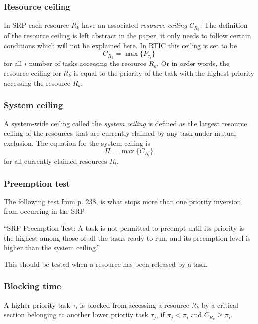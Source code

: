 \subsubsection{Resource ceiling}
\label{theory:srp:definitions:resource}
In SRP each resource $R_k$ have an associated \emph{resource ceiling}
$C_{R_k}$. The definition of the resource ceiling is left abstract in the
paper, it only needs to follow certain conditions which will not be explained
here. In RTIC this ceiling is set to be
\begin{equation}
    C_{R_k} = \max\{P_{\tau_i}\}
\end{equation}
for all $i$ number of tasks accessing the resource $R_k$. Or in order words,
the resource ceiling for $R_k$ is equal to the priority of the task with the
highest priority accessing the resource $R_k$.

\subsubsection{System ceiling}
\label{theory:srp:definitions:system}
A system-wide ceiling called the \emph{system ceiling} is defined as the
largest resource ceiling of the resources that are currently claimed by
any task under mutual exclusion. The equation for the system ceiling is
\begin{equation}
    \Pi = \max\{C_{R_l}\}
\end{equation}
for all currently claimed resources $R_l$.

\subsubsection{Preemption test}
The following test from \cite{hardrealtimecomputingsystems} p. 238, is what
stops more than one priority inversion from occurring in the SRP
\begin{displayquote}
    “SRP Preemption Test: A task is not permitted to preempt until its priority
    is the highest among those of all the tasks ready to run, and its preemption
    level is higher than the system ceiling.”
\end{displayquote}
This should be tested when a resource has been released by a task.

\subsubsection{Blocking time}
\label{theory:srp:definitions:blocking}
A higher priority task $\tau_i$ is blocked from accessing a resource $R_k$ by a
critical section belonging to another lower priority task $\tau_j$, if $\pi_j <
\pi_i$ and $C_{R_k} \geq \pi_i$. 

